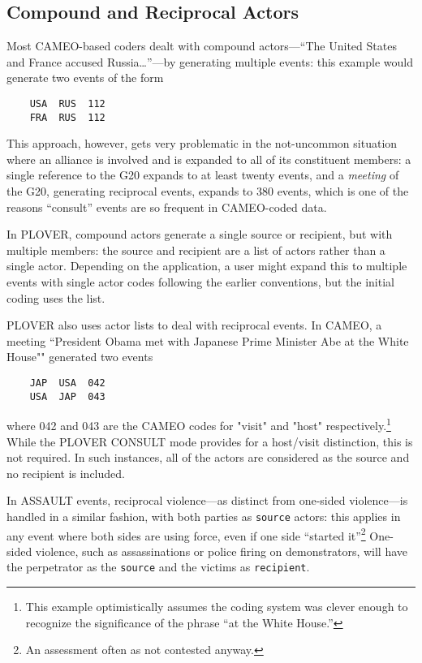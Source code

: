 \documentclass[11pt]{report}
\newcommand{\plcat}[1]{\textsf{#1}}
\begin{document}
\subsection{Compound and Reciprocal Actors}\label{sec:recip}

Most CAMEO-based coders dealt with compound actors---``The United States and France accused Russia\ldots''---by generating multiple events: this example would generate two events of the form
\begin{verbatim}
	USA  RUS  112
	FRA  RUS  112
\end{verbatim}
This approach, however, gets very problematic in the not-uncommon situation where an alliance is involved and is expanded to all of its constituent members: a single reference to the G20 expands to at least twenty events, and a \textit{meeting} of the G20, generating reciprocal events, expands to 380 events, which is one of the reasons ``consult'' events are so frequent in CAMEO-coded data.

In PLOVER, compound actors generate a single source or recipient, but with multiple members: the source and recipient are a list of actors rather than a single actor. Depending on the application, a user might expand this to multiple events with single actor codes following the earlier conventions, but the initial coding uses the list.

PLOVER also uses actor lists to deal with reciprocal events. In CAMEO, a meeting ``President Obama met with Japanese Prime Minister Abe at the White House"" generated two events
\begin{verbatim}
	JAP  USA  042
	USA  JAP  043
\end{verbatim}
where 042 and 043 are the CAMEO codes for "visit" and "host" respectively.\footnote{This example optimistically assumes the coding system was clever enough to recognize the significance of the phrase ``at the White House.''} While the PLOVER \plcat{CONSULT} mode provides for a host/visit distinction, this is not required. In such instances, all of the actors are considered as the source and no recipient is included.

In \plcat{ASSAULT} events, reciprocal violence---as distinct from one-sided violence---is handled in a similar fashion, with both parties as \texttt{source} actors: this applies in any event where both sides are using force, even if one side ``started it''\footnote{An assessment often as not contested anyway.} One-sided violence, such as assassinations or police firing on demonstrators, will have the perpetrator as the \texttt{source} and the victims as \texttt{recipient}.
\end{document}
